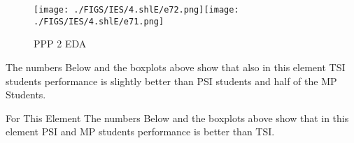 \documentclass[12pt]{extreport}
\begin{document}
\begin{figure}[H]
	\centering
	\texttt{[image: ./FIGS/IES/4.shlE/e72.png]}\texttt{[image: ./FIGS/IES/4.shlE/e71.png]}
	\caption{PPP 2 EDA}
	\label{fig:50}
\end{figure}

The numbers Below and the boxplots above show that also in this element  TSI students performance is slightly better than PSI students and half of the MP Students.

For This Element The numbers Below and the boxplots above show that in this element  PSI and MP students performance is  better than TSI.


\begin{comment}
\subparagraph{Interpretation of the Box-plots:}
For This Element 

\begin{enumerate}	
	\item The MP Class Box-Plot:
	\begin{enumerate}
		\item MAX = a {} {} {} {} {} {} {} {} UQ = b {} {} {} {} {} {} {} {} Median = c
		\item LQ = d {} {} {} {} {} {} {} {}  MIN =	l {} {} {} {} {} {} {} {}  IQR = e - f = g
	\end{enumerate}
	\item The PSI Class Box-Plot:
	\begin{enumerate}
		\item MAX = a {} {} {} {} {} {} {} {} UQ = b {} {} {} {} {} {} {} {} Median = c
		\item LQ = d {} {} {} {} {} {} {} {}  MIN =	e {} {} {} {} {} {} {} {} IQR = f - g = h	
	\end{enumerate}
	\item The TSI Class Box-Plot:
	\begin{enumerate}
		\item MAX = a {} {} {} {} {} {} {} {} UQ = b {} {} {} {} {} {} {} {} Median = c
		\item LQ = d {} {} {} {} {} {} {} {} MIN = e {} {} {} {} {} {} {} {} IQR = f - g = h	
	\end{enumerate}
\end{enumerate}

\subparagraph{Interpretation of the histogram:}
This Frequency Distribution is (Skeness) with the following descriptive statistics:
\begin{enumerate}
	\item Mean = 
	\item STD = 
	\item Range = a - b = c
	\item IQR = a-b = c 
\end{enumerate}

\end{comment}
\end{document}
